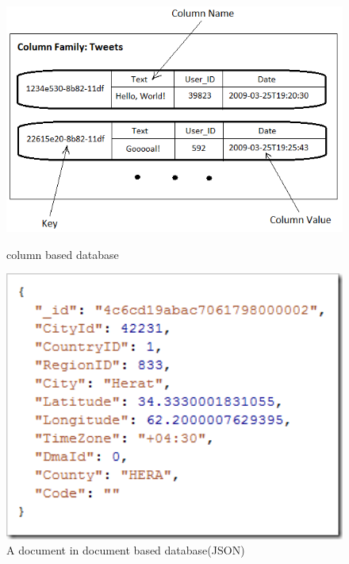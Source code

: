 	\begin{figure}[h]
	\centering
	 \begin{minipage}{.4\textwidth}
		\centering
		\includegraphics[width=1\textwidth]{img/column-family}
		\caption{column based database~\cite{wuoverview}}
		\label{fig:column-family-2}
	\end{minipage}
	\centering
	 \begin{minipage}{.4\textwidth}
			\centering
			\includegraphics[width=1\textwidth]{img/document-based-db}
			\caption{A document in document based database(JSON)}
			\label{fig:document-based-db}
		\end{minipage}
	\end{figure}
	

